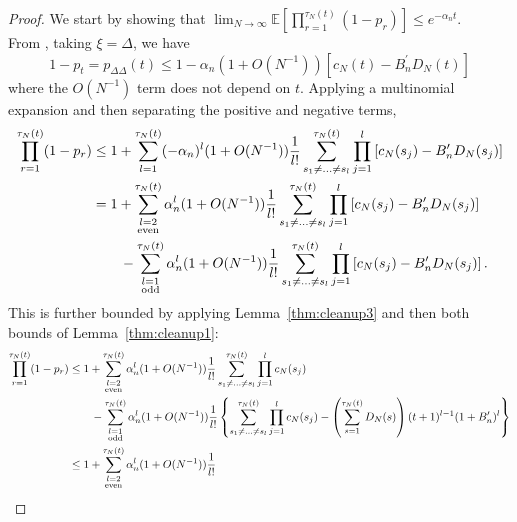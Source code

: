 \documentclass{article}
\newcommand{\E}{\mathbb{E}}
\newcommand{\1}[1]{\mathbbm{1}_{#1}}
\begin{document}
\begin{proof}
We start by showing that
$\lim_{N\to\infty}\E\left[ \prod_{r=1}^{\tau_N(t)} (1-p_r) \right] 
\leq e^{-\alpha_n t}$.\\
From \citet[Lemma 1 Case 1]{koskela2018}, taking $\xi=\Delta$, we have
\begin{equation} \label{eq:018}
1-p_t 
= p_{\Delta\Delta}(t) \leq 1 - \alpha_n (1+O(N^{-1})) 
        \left[ c_N(t) - B_n^\prime D_N(t) \right] 
\end{equation}
where the $O(N^{-1})$ term does not depend on $t$.
Applying a multinomial expansion and then separating the positive and negative terms,
\begin{align}
\prod_{r=1}^{\tau_N(t)} (1-p_r)
&\leq 1 + \sum_{l=1}^{\tau_N(t)} (- \alpha_n)^l (1+O(N^{-1})) 
        \frac{1}{l!} \sum_{s_1\neq\dots\neq s_l}^{\tau_N(t)}\prod_{j=1}^l
        \left[ c_N(s_j) - B_n^\prime D_N(s_j) \right] \notag\\
&= 1 + \sum_{\substack{l=2 \\ \text{even} }}^{\tau_N(t)} 
        \alpha_n^l (1+O(N^{-1})) \frac{1}{l!} 
        \sum_{s_1\neq\dots\neq s_l}^{\tau_N(t)}\prod_{j=1}^l
        \left[ c_N(s_j) - B_n^\prime D_N(s_j) \right] \notag\\
    &\qquad- \sum_{\substack{l=1 \\ \text{odd} }}^{\tau_N(t)} 
        \alpha_n^l (1+O(N^{-1})) \frac{1}{l!} 
        \sum_{s_1\neq\dots\neq s_l}^{\tau_N(t)}\prod_{j=1}^l
        \left[ c_N(s_j) - B_n^\prime D_N(s_j) \right] .
\end{align}
This is further bounded by applying Lemma~\ref{thm:cleanup3} and then both bounds of Lemma~\ref{thm:cleanup1}:
\begin{align}
\prod_{r=1}^{\tau_N(t)} (1-p_r)
&\leq 1 + \sum_{\substack{l=2 \\ \text{even} }}^{\tau_N(t)} 
        \alpha_n^l (1+O(N^{-1})) \frac{1}{l!} 
        \sum_{s_1\neq\dots\neq s_l}^{\tau_N(t)}\prod_{j=1}^l c_N(s_j) \notag\\
    &\qquad- \sum_{\substack{l=1 \\ \text{odd} }}^{\tau_N(t)} 
        \alpha_n^l (1+O(N^{-1})) \frac{1}{l!} 
        \left\{ \sum_{s_1\neq\dots\neq s_l}^{\tau_N(t)}\prod_{j=1}^l c_N(s_j)
        - \left( \sum_{s=1}^{\tau_N(t)} D_N(s) \right) 
        (t+1)^{l-1} (1+B_n^\prime)^l \right\} \notag\\
&\leq 1 + \sum_{\substack{l=2 \\ \text{even} }}^{\tau_N(t)} 
        \alpha_n^l (1+O(N^{-1})) \frac{1}{l!} 

\end{align}
\end{proof}
\end{document}
